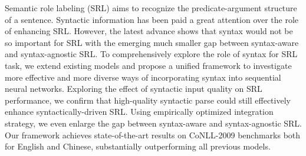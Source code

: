 Semantic role labeling (SRL) aims to recognize the predicate-argument structure of a sentence. Syntactic information has been paid a great attention over the role of enhancing SRL. However, the latest advance shows that syntax would not be so important for SRL with the emerging much smaller gap between syntax-aware and syntax-agnostic SRL. To comprehensively explore the role of syntax for SRL task, we extend existing models and propose a unified framework to investigate more effective and more diverse ways of incorporating syntax into sequential neural networks. Exploring the effect of syntactic input quality on SRL performance, we confirm that high-quality syntactic parse could still effectively enhance syntactically-driven SRL. Using empirically optimized integration strategy, we even enlarge the gap between syntax-aware and syntax-agnostic SRL. Our framework achieves state-of-the-art results on CoNLL-2009 benchmarks both for English and Chinese, substantially outperforming all previous models.
